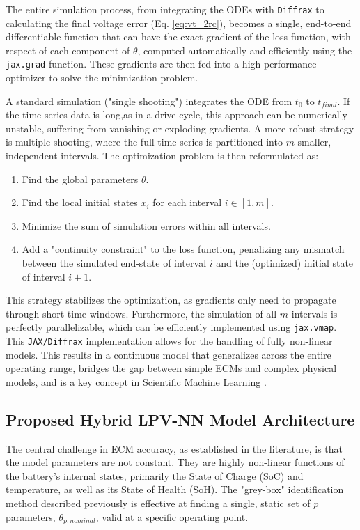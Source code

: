 \documentclass[lettersize,journal]{IEEEtran}
\begin{document}
The entire simulation process, from integrating the ODEs with \texttt{Diffrax} to calculating the final voltage error (Eq. \ref{eq:vt_2rc}), becomes a single, end-to-end differentiable function that can have the exact gradient of the loss function, with respect of each component of $\theta$, computed automatically and efficiently using the  \texttt{jax.grad} function. These gradients are then fed into a high-performance optimizer to solve the minimization problem.

A standard simulation ("single shooting") integrates the ODE from $t_0$ to $t_{final}$. If the time-series data is long,as in a drive cycle, this approach can be numerically unstable, suffering from vanishing or exploding gradients. A more robust strategy is multiple shooting, where the full time-series is partitioned into $m$ smaller, independent intervals. The optimization problem is then reformulated as:
\begin{enumerate}
	\item Find the global parameters $\theta$.
	\item Find the local initial states $x_i$ for each interval $i \in [1, m]$.
	\item Minimize the sum of simulation errors within all intervals.
	\item Add a "continuity constraint" to the loss function, penalizing any mismatch between the simulated end-state of interval $i$ and the (optimized) initial state of interval $i+1$.
\end{enumerate}

This strategy stabilizes the optimization, as gradients only need to propagate through short time windows. Furthermore, the simulation of all $m$ intervals is perfectly parallelizable, which can be efficiently implemented using \texttt{jax.vmap}. This \texttt{JAX/Diffrax} implementation allows for the handling of fully non-linear models. This results in a continuous model that generalizes across the entire operating range, bridges the gap between simple ECMs and complex physical models, and is a key concept in Scientific Machine Learning \cite{rackauckas2020universal}.

\subsection{Proposed Hybrid LPV-NN Model Architecture}

The central challenge in ECM accuracy, as established in the literature, is that the model parameters are not constant. They are highly non-linear functions of the battery's internal states, primarily the State of Charge (SoC) and temperature, as well as its State of Health (SoH)\cite{tran2021comprehensive, yang2023improved}. The "grey-box" identification method described previously is effective at finding a single, static set of $p$ parameters, $\theta_{p, nominal}$, valid at a specific operating point.
\end{document}
